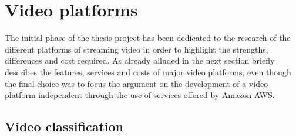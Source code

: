 \section{Video platforms}
\label{sec:Video platforms}

The initial phase of the thesis project has been dedicated to the research of the different platforms of streaming video in order to highlight the strengths, differences and cost required. As already alluded in the next section briefly describes the features, services and costs of major video platforms, even though the final choice was to focus the argument on the development of a video platform independent through the use of services offered by Amazon AWS.


\subsection{Video classification }
\label{sec:Video classification}

